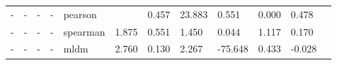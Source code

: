 \begin{landscape}
\begin{table}[H]
\begin{tabular}{|l|p{1cm}|p{1cm}|p{1cm}|p{2cm}|p{1.5cm}|p{1.5cm}|p{1.5cm}|p{1.5cm}|p{1.5cm}|p{1.5cm}|p{1.5cm}|}
-  & -             & -                 & -           & pearson    &                              & 0.457              & 23.883                      & 0.551      & 0.000             & 0.478                            \\
-  & -             & -                 & -           & spearman   & 1.875                        & 0.551              & 1.450                       & 0.044      & 1.117             & 0.170                            \\
-  & -             & -                 & -           & mldm       & 2.760                        & 0.130              & 2.267                       & -75.648    & 0.433             & -0.028                           \\ \hline
\end{tabular}
\end{table}
\end{landscape}
